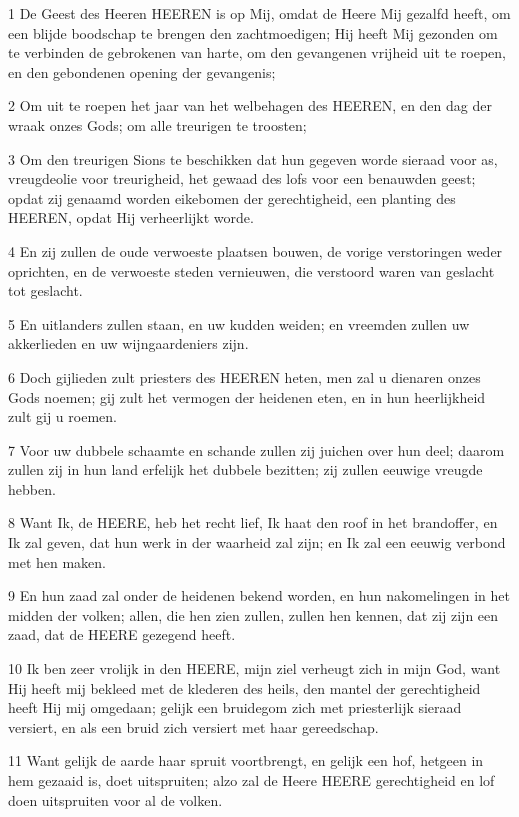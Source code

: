 \par 1 De Geest des Heeren HEEREN is op Mij, omdat de Heere Mij gezalfd heeft, om een blijde boodschap te brengen den zachtmoedigen; Hij heeft Mij gezonden om te verbinden de gebrokenen van harte, om den gevangenen vrijheid uit te roepen, en den gebondenen opening der gevangenis;
\par 2 Om uit te roepen het jaar van het welbehagen des HEEREN, en den dag der wraak onzes Gods; om alle treurigen te troosten;
\par 3 Om den treurigen Sions te beschikken dat hun gegeven worde sieraad voor as, vreugdeolie voor treurigheid, het gewaad des lofs voor een benauwden geest; opdat zij genaamd worden eikebomen der gerechtigheid, een planting des HEEREN, opdat Hij verheerlijkt worde.
\par 4 En zij zullen de oude verwoeste plaatsen bouwen, de vorige verstoringen weder oprichten, en de verwoeste steden vernieuwen, die verstoord waren van geslacht tot geslacht.
\par 5 En uitlanders zullen staan, en uw kudden weiden; en vreemden zullen uw akkerlieden en uw wijngaardeniers zijn.
\par 6 Doch gijlieden zult priesters des HEEREN heten, men zal u dienaren onzes Gods noemen; gij zult het vermogen der heidenen eten, en in hun heerlijkheid zult gij u roemen.
\par 7 Voor uw dubbele schaamte en schande zullen zij juichen over hun deel; daarom zullen zij in hun land erfelijk het dubbele bezitten; zij zullen eeuwige vreugde hebben.
\par 8 Want Ik, de HEERE, heb het recht lief, Ik haat den roof in het brandoffer, en Ik zal geven, dat hun werk in der waarheid zal zijn; en Ik zal een eeuwig verbond met hen maken.
\par 9 En hun zaad zal onder de heidenen bekend worden, en hun nakomelingen in het midden der volken; allen, die hen zien zullen, zullen hen kennen, dat zij zijn een zaad, dat de HEERE gezegend heeft.
\par 10 Ik ben zeer vrolijk in den HEERE, mijn ziel verheugt zich in mijn God, want Hij heeft mij bekleed met de klederen des heils, den mantel der gerechtigheid heeft Hij mij omgedaan; gelijk een bruidegom zich met priesterlijk sieraad versiert, en als een bruid zich versiert met haar gereedschap.
\par 11 Want gelijk de aarde haar spruit voortbrengt, en gelijk een hof, hetgeen in hem gezaaid is, doet uitspruiten; alzo zal de Heere HEERE gerechtigheid en lof doen uitspruiten voor al de volken.

